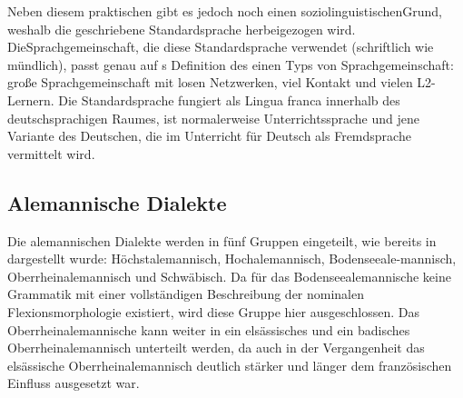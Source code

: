 Neben diesem praktischen gibt es jedoch noch einen soziolinguistischen\linebreak Grund, weshalb die geschriebene Standardsprache herbeigezogen wird. Die\linebreak Sprachgemeinschaft, die diese Standardsprache verwendet (schriftlich wie mündlich), passt genau auf \citeauthor{Trudgill2011}s \citeyearpar{Trudgill2011} Definition des einen Typs von Sprachgemeinschaft: große Sprachgemeinschaft mit losen Netzwerken, viel Kontakt und vielen L2-Ler\-nern. Die Standardsprache fungiert als Lingua franca innerhalb des deutschsprachigen Raumes, ist normalerweise Unterrichtssprache und jene Variante des Deutschen, die im Unterricht für Deutsch als Fremdsprache vermittelt wird.

\subsection{Alemannische Dialekte}\label{3.3.3}

Die alemannischen Dialekte werden in fünf Gruppen eingeteilt, wie bereits in  dargestellt wurde: Höchstalemannisch, Hochalemannisch, Bodenseeale-\linebreak mannisch, Oberrheinalemannisch und Schwäbisch. Da für das Bodenseealemannische keine Grammatik mit einer vollständigen Beschreibung der nominalen Flexionsmorphologie existiert, wird diese Gruppe hier ausgeschlossen. Das Oberrheinalemannische kann weiter in ein elsässisches und ein badisches Oberrheinalemannisch unterteilt werden, da auch in der Vergangenheit das elsässische Oberrheinalemannisch deutlich stärker und länger dem französischen Einfluss ausgesetzt war.

